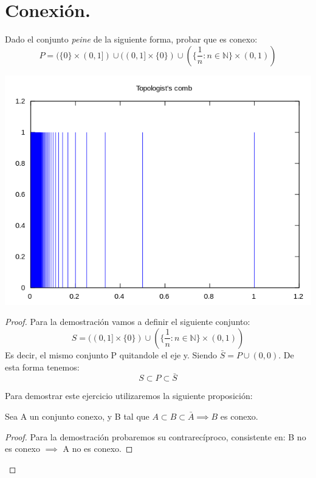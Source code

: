 \section{Conexión.}
\begin{ejer} Dado el conjunto \emph{peine} de la siguiente forma, probar que es conexo:
\[
	P = (\{ 0\} \times (0,1]) \cup ((0,1] \times \{0\}) \cup (\{\frac{1}{n} : n \in \mathbb{N}\} \times (0,1))
\]

\begin{center}
\includegraphics[scale=0.4]{img/peine.png}
\end{center}

\begin{proof}
Para la demostración vamos a definir el siguiente conjunto:
\[
	S = ((0,1] \times \{0\}) \cup (\{\frac{1}{n} : n \in \mathbb{N}\} \times (0,1))
\]
Es decir, el mismo conjunto P quitandole el eje y. Siendo $\bar{S} = P \cup (0,0)$.
De esta forma tenemos:
\[
S \subset P \subset \bar{S}
\]

Para demostrar este ejercicio utilizaremos la siguiente proposición:\\

\begin{nprop}
Sea A un conjunto conexo, y B tal que $A \subset B \subset \bar{A} \implies B$ es conexo.
\end{nprop}

\begin{proof}
 Para la demostración probaremos su contrarecíproco, consistente en: B no es conexo $\implies$ A no es conexo.


\end{proof}
\end{proof}
\end{ejer}
